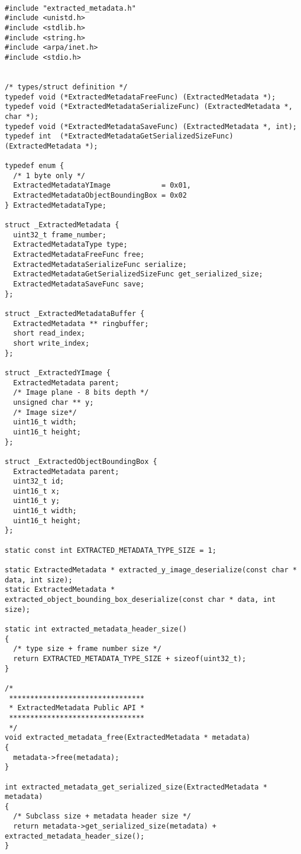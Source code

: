 \begin{lstlisting}

#include "extracted_metadata.h"
#include <unistd.h>
#include <stdlib.h>
#include <string.h>
#include <arpa/inet.h>
#include <stdio.h>


/* types/struct definition */
typedef void (*ExtractedMetadataFreeFunc) (ExtractedMetadata *);
typedef void (*ExtractedMetadataSerializeFunc) (ExtractedMetadata *, char *);
typedef void (*ExtractedMetadataSaveFunc) (ExtractedMetadata *, int);
typedef int  (*ExtractedMetadataGetSerializedSizeFunc) (ExtractedMetadata *);

typedef enum {
  /* 1 byte only */
  ExtractedMetadataYImage            = 0x01,
  ExtractedMetadataObjectBoundingBox = 0x02
} ExtractedMetadataType;

struct _ExtractedMetadata {
  uint32_t frame_number;
  ExtractedMetadataType type;
  ExtractedMetadataFreeFunc free;
  ExtractedMetadataSerializeFunc serialize;
  ExtractedMetadataGetSerializedSizeFunc get_serialized_size;
  ExtractedMetadataSaveFunc save;
};

struct _ExtractedMetadataBuffer {
  ExtractedMetadata ** ringbuffer;
  short read_index;
  short write_index;
};

struct _ExtractedYImage {
  ExtractedMetadata parent;
  /* Image plane - 8 bits depth */
  unsigned char ** y;
  /* Image size*/
  uint16_t width;
  uint16_t height;
};

struct _ExtractedObjectBoundingBox {
  ExtractedMetadata parent;
  uint32_t id;
  uint16_t x;
  uint16_t y;
  uint16_t width;
  uint16_t height;
};

static const int EXTRACTED_METADATA_TYPE_SIZE = 1;

static ExtractedMetadata * extracted_y_image_deserialize(const char * data, int size);
static ExtractedMetadata * extracted_object_bounding_box_deserialize(const char * data, int size);

static int extracted_metadata_header_size()
{
  /* type size + frame number size */
  return EXTRACTED_METADATA_TYPE_SIZE + sizeof(uint32_t);
}

/*
 ********************************
 * ExtractedMetadata Public API *
 ********************************
 */
void extracted_metadata_free(ExtractedMetadata * metadata)
{
  metadata->free(metadata);
}

int extracted_metadata_get_serialized_size(ExtractedMetadata * metadata)
{
  /* Subclass size + metadata header size */
  return metadata->get_serialized_size(metadata) + extracted_metadata_header_size();
}


\end{lstlisting}
